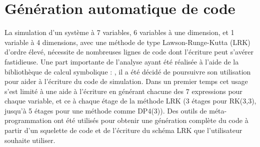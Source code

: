 
\section{Génération automatique de code}


La simulation d'un système à 7 variables, 6 variables à une dimension, et 1 variable à 4 dimensions, avec une méthode de type Lawson-Runge-Kutta (LRK) d'ordre élevé, nécessite de nombreuses lignes de code dont l'écriture peut s'avérer fastidieuse. Une part importante de l'analyse ayant été réalisée à l'aide de la bibliothèque de calcul symbolique \Python{} : \sympy, il a été décidé de poursuivre son utilisation pour aider à l'écriture du code de simulation. Dans un premier temps cet usage s'est limité à une aide à l'écriture en générant chacune des 7 expressions pour chaque variable, et ce à chaque étage de la méthode LRK (3 étages pour RK(3,3), jusqu'à 5 étages pour une méthode comme DP4(3)). Des outils de méta-programmation ont été utilisés pour obtenir une génération complète du code à partir d'un squelette de code et de l'écriture du schéma LRK que l'utilisateur souhaite utiliser.

